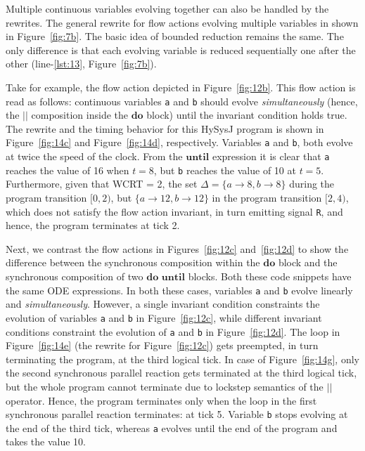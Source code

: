 \documentclass[10pt,journal,cspaper,compsoc]{IEEEtran}
\begin{document}
Multiple continuous variables evolving together can also be handled by
the rewrites. The general rewrite for flow actions evolving multiple
variables in shown in Figure~\ref{fig:7b}. The basic idea of bounded
reduction remains the same. The only difference is that each evolving
variable is reduced sequentially one after the other (line-\ref{lst:13},
Figure~\ref{fig:7b}).

Take for example, the flow action depicted in Figure~\ref{fig:12b}. This
flow action is read as follows: continuous variables \texttt{a} and
\texttt{b} should evolve \textit{simultaneously} (hence, the $||$
composition inside the $\mathbf{do}$ block) until the invariant
condition holds true.  The rewrite and the timing behavior for this
HySysJ program is shown in Figure~\ref{fig:14c} and
Figure~\ref{fig:14d}, respectively. Variables \texttt{a} and \texttt{b},
both evolve at twice the speed of the clock. From the $\mathbf{until}$
expression it is clear that \texttt{a} reaches the value of 16 when
$t = 8$, but \texttt{b} reaches the value of 10 at $t=5$. Furthermore,
given that WCRT = 2, the set
$\Delta = \{a \rightarrow 8, b \rightarrow 8\}$ during the program
transition $[0,2)$, but $\{a \rightarrow 12, b \rightarrow 12\}$ in the
program transition $[2,4)$, which does not satisfy the flow action
invariant, in turn emitting signal \texttt{R}, and hence, the program
terminates at tick 2.

Next, we contrast the flow actions in Figures~\ref{fig:12c}
and~\ref{fig:12d} to show the difference between the synchronous
composition within the $\mathbf{do}$ block and the synchronous
composition of two $\mathbf{do}$ $\mathbf{until}$ blocks. Both these
code snippets have the same ODE expressions. In both these cases,
variables \texttt{a} and \texttt{b} evolve linearly and
\textit{simultaneously}. However, a single invariant condition
constraints the evolution of variables \texttt{a} and \texttt{b} in
Figure~\ref{fig:12c}, while different invariant conditions constraint
the evolution of \texttt{a} and \texttt{b} in Figure~\ref{fig:12d}. The
loop in Figure~\ref{fig:14e} (the rewrite for Figure~\ref{fig:12c}) gets
preempted, in turn terminating the program, at the third logical
tick. In case of Figure~\ref{fig:14g}, only the second synchronous
parallel reaction gets terminated at the third logical tick, but the
whole program cannot terminate due to lockstep semantics of the $||$
operator. Hence, the program terminates only when the loop in the first
synchronous parallel reaction terminates: at tick 5. Variable \texttt{b}
stops evolving at the end of the third tick, whereas \texttt{a} evolves
until the end of the program and takes the value 10.
\end{document}
